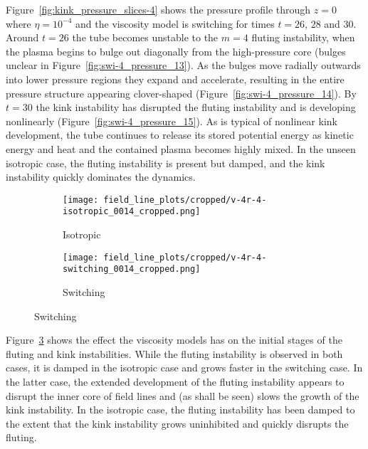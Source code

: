 Figure~\ref{fig:kink_pressure_slices-4} shows the pressure profile through $z=0$ where $\eta=10^{-4}$ and the viscosity model is switching for times $t=26$, $28$ and $30$. Around $t=26$ the tube becomes unstable to the $m=4$ fluting instability, when the plasma begins to bulge out diagonally from the high-pressure core (bulges unclear in Figure~\ref{fig:swi-4_pressure_13}). As the bulges move radially outwards into lower pressure regions they expand and accelerate, resulting in the entire pressure structure appearing clover-shaped (Figure~\ref{fig:swi-4_pressure_14}). By $t=30$ the kink instability has disrupted the fluting instability and is developing nonlinearly (Figure~\ref{fig:swi-4_pressure_15}). As is typical of nonlinear kink development, the tube continues to release its stored potential energy as kinetic energy and heat and the contained plasma becomes highly mixed. In the unseen isotropic case, the fluting instability is present but damped, and the kink instability quickly dominates the dynamics.

\begin{figure}[t]
  \centering
    \begin{subfigure}{0.49\textwidth}
      \texttt{[image: field\_line\_plots/cropped/v-4r-4-isotropic\_0014\_cropped.png]}
      \caption{Isotropic}
      \label{fig:field_line_plots_iso}
    \end{subfigure}
    \hfill
    \begin{subfigure}{0.49\textwidth}
      \texttt{[image: field\_line\_plots/cropped/v-4r-4-switching\_0014\_cropped.png]}
      \caption{Switching}
      \label{fig:field_line_plots_swi}
    \end{subfigure}
\label{fig:kink_field_line_plots}%
\end{figure}

Figure~\ref{fig:kink_field_line_plots} shows the effect the viscosity models has on the initial stages of the fluting and kink instabilities. While the fluting instability is observed in both cases, it is damped in the isotropic case and grows faster in the switching case. In the latter case, the extended development of the fluting instability appears to disrupt the inner core of field lines and (as shall be seen) slows the growth of the kink instability. In the isotropic case, the fluting instability has been damped to the extent that the kink instability grows uninhibited and quickly disrupts the fluting.

